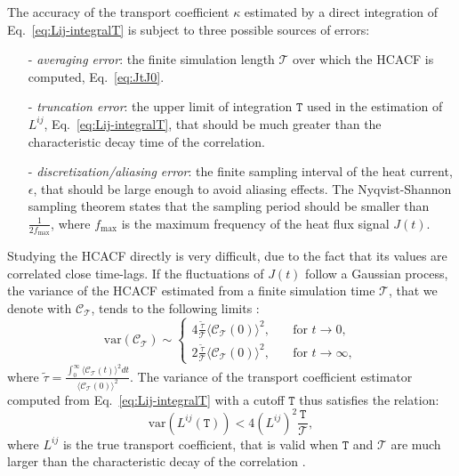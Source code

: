 \begin{LEtext}
The accuracy of the transport coefficient $\kappa$ estimated by a direct integration of Eq.~\eqref{eq:Lij-integralT} is subject to three possible sources of errors:
\begin{itemize}
    \item[-] \emph{averaging error}: the finite simulation length $\mathcal{T}$ over which the HCACF is computed, Eq.~\eqref{eq:JtJ0}.
    \item[-] \emph{truncation error}: the upper limit of integration $\mathtt{T}$ used in the estimation of $L^{ij}$, Eq.~\eqref{eq:Lij-integralT}, that should be much greater than the characteristic decay time of the correlation.
    \item[-] \emph{discretization/aliasing error}: the finite sampling interval of the heat current, $\epsilon$, that should be large enough to avoid aliasing effects. The Nyqvist-Shannon sampling theorem \cite{Oppenheim1999} states that the sampling period should be smaller than $\frac{1}{2f_\mathrm{max}}$, where $f_\mathrm{max}$ is the maximum frequency of the heat flux signal $J(t)$.
\end{itemize}
Studying the HCACF directly is very difficult, due to the fact that its values are correlated close time-lags. 
If the fluctuations of $J(t)$ follow a Gaussian process, the variance of the HCACF estimated from a finite simulation time $\mathcal{T}$, that we denote with $\mathcal{C}_\mathcal{T}$, tends to the following limits \cite{Jones2012}:
\begin{equation}
    \mathrm{var} \left(\mathcal{C}_\mathcal{T}\right) \sim \left\{
    \begin{aligned}
        4 \frac{\tilde\tau}{\mathcal{T}} \langle \mathcal{C}_\mathcal{T}(0) \rangle^2 , \quad &\text{for }t\rightarrow 0 , \\
        2 \frac{\tilde\tau}{\mathcal{T}} \langle \mathcal{C}_\mathcal{T}(0) \rangle^2 , \quad &\text{for }t\rightarrow \infty ,
    \end{aligned} \right.
\end{equation}
where $\tilde\tau = \frac{\int_0^\infty \langle \mathcal{C}_\mathcal{T}(t) \rangle^2 dt}{\langle \mathcal{C}_\mathcal{T}(0) \rangle^2}$. The variance of the transport coefficient estimator computed from Eq.~\eqref{eq:Lij-integralT} with a cutoff $\mathtt{T}$ thus satisfies the relation:
\begin{equation}
    \mathrm{var} \left(L^{ij}(\mathtt{T})\right) < 4 \left(L^{ij}\right)^2 \frac{\mathtt{T}}{\mathcal{T}} ,
\end{equation}
where $L^{ij}$ is the true transport coefficient, that is valid when $\mathtt{T}$ and $\mathcal{T}$ are much larger than the characteristic decay of the correlation \cite{Jones2012}.


\end{LEtext}
